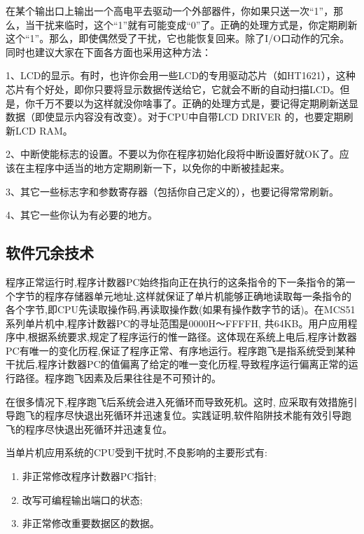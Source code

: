\begin{remark}

在某个输出口上输出一个高电平去驱动一个外部器件，你如果只送一次“1”，那么，当干扰来临时，这个“1”就有可能变成“0”了。正确的处理方式是，你定期刷新这个“1”。那么，即使偶然受了干扰，它也能恢复回来。除了I/O口动作的冗余。同时也建议大家在下面各方面也采用这种方法：

1、LCD的显示。有时，也许你会用一些LCD的专用驱动芯片（如HT1621），这种芯片有个好处，即你只要将显示数据传送给它，它就会不断的自动扫描LCD。但是，你千万不要以为这样就没你啥事了。正确的处理方式是，要记得定期刷新送显数据（即使显示内容没有改变）。对于CPU中自带LCD DRIVER 的，也要定期刷新LCD RAM。

2、中断使能标志的设置。不要以为你在程序初始化段将中断设置好就OK了。应该在主程序中适当的地方定期刷新一下，以免你的中断被挂起来。

3、其它一些标志字和参数寄存器（包括你自己定义的），也要记得常常刷新。

4、其它一些你认为有必要的地方。
\end{remark}


\subsection{软件冗余技术}

程序正常运行时,程序计数器PC始终指向正在执行的这条指令的下一条指令的第一个字节的程序存储器单元地址,这样就保证了单片机能够正确地读取每一条指令的各个字节,即CPU先读取操作码,再读取操作数(如果有操作数字节的话)。在MCS51系列单片机中,程序计数器PC的寻址范围是0000H～FFFFH, 共64KB。用户应用程序中,根据系统要求,规定了程序运行的惟一路径。这体现在系统上电后,程序计数器PC有唯一的变化历程,保证了程序正常、有序地运行。程序跑飞是指系统受到某种干扰后,程序计数器PC的值偏离了给定的唯一变化历程,导致程序运行偏离正常的运行路径。程序跑飞因素及后果往往是不可预计的。

在很多情况下,程序跑飞后系统会进入死循环而导致死机。这时,
应采取有效措施引导跑飞的程序尽快退出死循环并迅速复位。实践证明,软件陷阱技术能有效引导跑飞的程序尽快退出死循环并迅速复位。


当单片机应用系统的CPU受到干扰时,不良影响的主要形式有:

\begin{enumerate}
  \item 非正常修改程序计数器PC指针;
  \item 改写可编程输出端口的状态;
  \item 非正常修改重要数据区的数据。
\end{enumerate}


